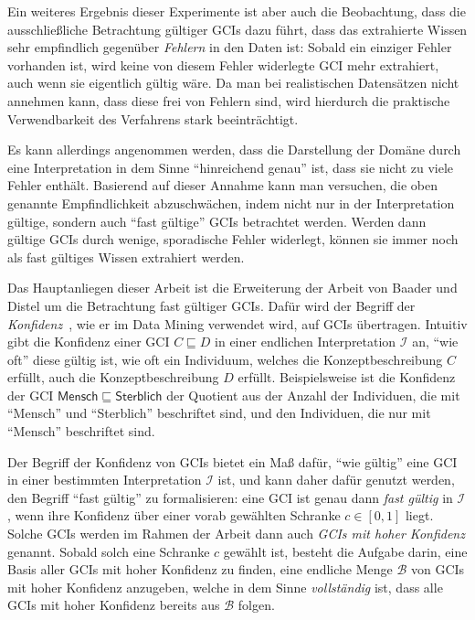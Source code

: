 \documentclass[ngerman,fleqn,DIV=12]{scrartcl}
\begin{document}
Ein weiteres Ergebnis dieser Experimente ist aber auch die Beobachtung, dass die
ausschließliche Betrachtung gültiger GCIs dazu führt, dass das extrahierte Wissen sehr
empfindlich gegenüber \emph{Fehlern} in den Daten ist: Sobald ein einziger Fehler
vorhanden ist, wird keine von diesem Fehler widerlegte GCI mehr extrahiert, auch wenn sie
eigentlich gültig wäre.  Da man bei realistischen Datensätzen nicht annehmen kann, dass
diese frei von Fehlern sind, wird hierdurch die praktische Verwendbarkeit des Verfahrens
stark beeinträchtigt.

Es kann allerdings angenommen werden, dass die Darstellung der Domäne durch eine
Interpretation in dem Sinne \enquote{hinreichend genau} ist, dass sie nicht zu viele
Fehler enthält.  Basierend auf dieser Annahme kann man versuchen, die oben genannte
Empfindlichkeit abzuschwächen, indem nicht nur in der Interpretation gültige, sondern auch
\enquote{fast gültige} GCIs betrachtet werden.  Werden dann gültige GCIs durch wenige,
sporadische Fehler widerlegt, können sie immer noch als fast gültiges Wissen extrahiert
werden.

Das Hauptanliegen dieser Arbeit ist die Erweiterung der Arbeit von Baader und Distel um
die Betrachtung fast gültiger GCIs.  Dafür wird der Begriff der
\emph{Konfidenz}~\cite{arules:agrawal:association-rules}, wie er im Data Mining verwendet
wird, auf GCIs übertragen.  Intuitiv gibt die Konfidenz einer GCI $C \sqsubseteq D$ in
einer endlichen Interpretation $\mathcal{I}$ an, \enquote{wie oft} diese gültig ist, \dh
wie oft ein Individuum, welches die Konzeptbeschreibung $C$ erfüllt, auch die
Konzeptbeschreibung $D$ erfüllt.  Beispielsweise ist die Konfidenz der GCI
$\mathsf{Mensch} \sqsubseteq \mathsf{Sterblich}$ der Quotient aus der Anzahl der
Individuen, die mit \enquote{\textsf{Mensch}} und \enquote{\textsf{Sterblich}} beschriftet
sind, und den Individuen, die nur mit \enquote{\textsf{Mensch}} beschriftet sind.

Der Begriff der Konfidenz von GCIs bietet ein Maß dafür, \enquote{wie gültig} eine GCI in
einer bestimmten Interpretation $\mathcal{I}$ ist, und kann daher dafür genutzt werden,
den Begriff \enquote{fast gültig} zu formalisieren: eine GCI ist genau dann \emph{fast
  gültig} in $\mathcal{I}$, wenn ihre Konfidenz über einer vorab gewählten Schranke $c \in
[0,1]$ liegt.  Solche GCIs werden im Rahmen der Arbeit dann auch \emph{GCIs mit hoher
  Konfidenz} genannt.  Sobald solch eine Schranke $c$ gewählt ist, besteht die Aufgabe
darin, eine Basis aller GCIs mit hoher Konfidenz zu finden, \dh eine endliche Menge
$\mathcal{B}$ von GCIs mit hoher Konfidenz anzugeben, welche in dem Sinne
\emph{vollständig} ist, dass alle GCIs mit hoher Konfidenz bereits aus $\mathcal{B}$
folgen.
\end{document}
